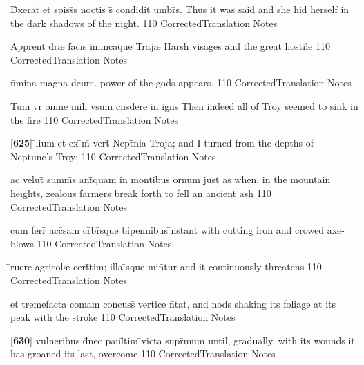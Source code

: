 \latline
  {D\={\macron {\i}}xerat et spiss\={\macron {\i}}s noctis s\={} condidit umbr\={\macron {\i}}s.}
  { Thus it was said and she hid herself in the dark shadows of the night. }
  {110}
  { CorrectedTranslation }
  { Notes }


\latline
  {App\={}rent d\={\macron {\i}}r{\ae} faci\={}s inim\={\macron {\i}}caque Traj{\ae}}
  { Harsh visages and the great hostile }
  {110}
  { CorrectedTranslation }
  { Notes }


\latline
  {n\={}mina magna deum.}
  { power of the gods appears. }
  {110}
  { CorrectedTranslation }
  { Notes }


\latline
  {Tum v\={}r\={} omne mih\={\macron {\i}} v\={\macron {\i}}sum c\={}ns\={\macron {\i}}dere in ign\={\macron {\i}}s}
  { Then indeed all of Troy seemed to sink in the fire }
  {110}
  { CorrectedTranslation }
  { Notes }


\latline
  {[\textbf{625}] \={}lium et ex \={\macron {\i}}m\={} vert\={\macron {\i}} Nept\={}nia Troja;}
  { and I turned from the depths of Neptune's Troy; }
  {110}
  { CorrectedTranslation }
  { Notes }


\latline
  {ac velut\={\macron {\i}} summ\={\macron {\i}}s ant\={\macron {\i}}quam in montibus ornum}
  { just as when, in the mountain heights, zealous farmers break forth to fell an ancient ash }
  {110}
  { CorrectedTranslation }
  { Notes }


\latline
  {cum ferr\={} acc\={\macron {\i}}sam cr\={}br\={\macron {\i}}sque bipennibus \={\macron {\i}}nstant}
  { with cutting iron and crowed axe-blows }
  {110}
  { CorrectedTranslation }
  { Notes }


\latline
  {\={}ruere agricol{\ae} cert\={}tim; illa \={}sque min\={}tur}
  { and it continuously threatens }
  {110}
  { CorrectedTranslation }
  { Notes }


\latline
  {et tremefacta comam concuss\={} vertice n\={}tat,}
  { and nods shaking its foliage at its peak with the stroke  }
  {110}
  { CorrectedTranslation }
  { Notes }


\latline
  {[\textbf{630}] vulneribus d\={}nec paul\={}tim \={}victa supr\={}mum}
  { until, gradually, with its wounds it has groaned its last, overcome }
  {110}
  { CorrectedTranslation }
  { Notes }


